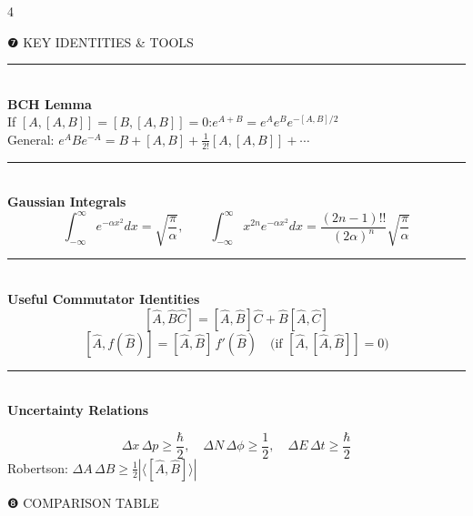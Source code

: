 \documentclass[9pt,landscape]{article}
\newcommand{\mysec}[1]{%
  \vspace{3pt}%
  {\color{midviolet}\rule{\linewidth}{0.6pt}}\\[-1pt]%
  {\bfseries\color{deepviolet}\small #1}\\[0.5pt]%
}
\begin{document}
\begin{multicols}{4}
\begin{tcolorbox}[sectionbox]
  \centering ❼\; KEY IDENTITIES \& TOOLS
\end{tcolorbox}

\mysec{BCH Lemma}
If $[A,[A,B]]=[B,[A,B]]=0$:\quad $e^{A+B}=e^A e^B e^{-[A,B]/2}$\\
General: $e^A B e^{-A}=B+[A,B]+\tfrac{1}{2!}[A,[A,B]]+\cdots$

\mysec{Gaussian Integrals}
\[
  \int_{-\infty}^{\infty}e^{-\alpha x^2}dx=\sqrt{\frac{\pi}{\alpha}},\qquad
  \int_{-\infty}^{\infty}x^{2n}e^{-\alpha x^2}dx=\frac{(2n-1)!!}{(2\alpha)^n}\sqrt{\frac{\pi}{\alpha}}
\]

\mysec{Useful Commutator Identities}
\[
  [\hat{A},\hat{B}\hat{C}]=[\hat{A},\hat{B}]\hat{C}+\hat{B}[\hat{A},\hat{C}]
\]
\[
  [\hat{A},f(\hat{B})]=[\hat{A},\hat{B}]\,f'(\hat{B})\quad\text{(if $[\hat{A},[\hat{A},\hat{B}]]=0$)}
\]

\mysec{Uncertainty Relations}
\begin{tcolorbox}[rosebox]
\[
  \Delta x\,\Delta p\geq\frac{\hbar}{2},\quad
  \Delta N\,\Delta\phi\geq\frac{1}{2},\quad
  \Delta E\,\Delta t\geq\frac{\hbar}{2}
\]
Robertson: $\Delta A\,\Delta B\geq\tfrac{1}{2}|\langle[\hat{A},\hat{B}]\rangle|$
\end{tcolorbox}

\begin{tcolorbox}[sectionbox]
  \centering ❽\; COMPARISON TABLE
\end{tcolorbox}


\end{multicols}
\end{document}
